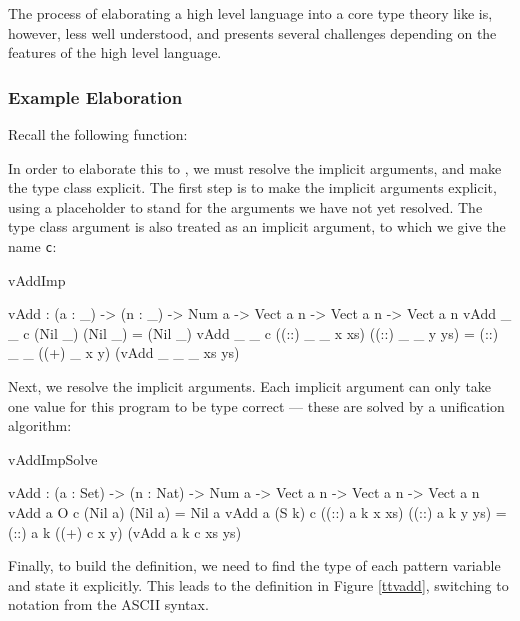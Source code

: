 The process of elaborating a high level language into a core type theory like \TT{} is,
however, less well understood, and presents several challenges depending on the
features of the high level language. 

\subsubsection{Example Elaboration}

Recall the following \Idris{} function:


\noindent
In order to elaborate
this to \TT{}, we must resolve the implicit arguments, and make the type class explicit.
The first step is to make the implicit arguments explicit, using a placeholder
to stand for the arguments we have not yet resolved. The type class argument is
also treated as an implicit argument, to which we give the name \texttt{c}:

\begin{SaveVerbatim}{vAddImp}

vAdd : (a : _) -> (n : _) -> Num a -> Vect a n -> Vect a n -> Vect a n
vAdd _ _ c (Nil _)         (Nil _)         = (Nil _)
vAdd _ _ c ((::) _ _ x xs) ((::) _ _ y ys) 
                = (::) _ _ ((+) _ x y) (vAdd _ _ _ xs ys)

\end{SaveVerbatim}

Next, we resolve the implicit arguments. Each implicit argument can only take
one value for this program to be type correct --- these are solved by a unification
algorithm:

\begin{SaveVerbatim}{vAddImpSolve}

vAdd : (a : Set) -> (n : Nat) -> Num a -> Vect a n -> Vect a n -> Vect a n
vAdd a O     c (Nil a)         (Nil a)         = Nil a
vAdd a (S k) c ((::) a k x xs) ((::) a k y ys) 
                = (::) a k ((+) c x y) (vAdd a k c xs ys)

\end{SaveVerbatim}

Finally, to build the \TT{} definition, we need to find the type of each pattern variable
and state it explicitly. This leads to the \TT{} definition in Figure \ref{ttvadd}, 
switching to \TT{} notation from the ASCII \Idris{} syntax.

